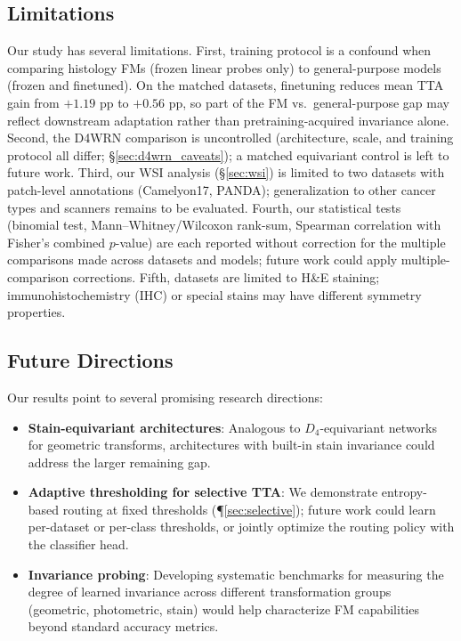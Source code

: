 \documentclass{melba}
\begin{document}
\subsection{Limitations}

Our study has several limitations. First, training protocol is a confound when comparing histology FMs (frozen linear probes only) to general-purpose models (frozen and finetuned). On the matched datasets, finetuning reduces mean TTA gain from $+1.19$ pp to $+0.56$ pp, so part of the FM vs.\ general-purpose gap may reflect downstream adaptation rather than pretraining-acquired invariance alone. Second, the D4WRN comparison is uncontrolled (architecture, scale, and training protocol all differ; \S\ref{sec:d4wrn_caveats}); a matched equivariant control is left to future work. Third, our WSI analysis (\S\ref{sec:wsi}) is limited to two datasets with patch-level annotations (Camelyon17, PANDA); generalization to other cancer types and scanners remains to be evaluated. Fourth, our statistical tests (binomial test, Mann--Whitney/Wilcoxon rank-sum, Spearman correlation with Fisher's combined $p$-value) are each reported without correction for the multiple comparisons made across datasets and models; future work could apply multiple-comparison corrections. Fifth, datasets are limited to H\&E staining; immunohistochemistry (IHC) or special stains may have different symmetry properties.


\subsection{Future Directions}

Our results point to several promising research directions:

\begin{itemize}
  \item \textbf{Stain-equivariant architectures}: Analogous to $D_4$-equivariant networks for geometric transforms, architectures with built-in stain invariance could address the larger remaining gap.
  \item \textbf{Adaptive thresholding for selective TTA}: We demonstrate entropy-based routing at fixed thresholds (\P\ref{sec:selective}); future work could learn per-dataset or per-class thresholds, or jointly optimize the routing policy with the classifier head.

  \item \textbf{Invariance probing}: Developing systematic benchmarks for measuring the degree of learned invariance across different transformation groups (geometric, photometric, stain) would help characterize FM capabilities beyond standard accuracy metrics.
\end{itemize}
\end{document}
